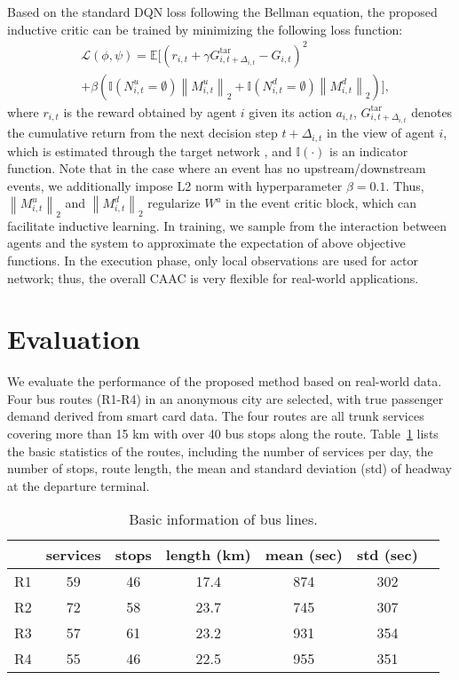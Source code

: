 \documentclass{article}
\begin{document}
Based on the standard DQN loss \cite{mnih2015human} following the  Bellman equation, the proposed inductive critic can be trained by minimizing the following loss function:
\begin{equation}
\begin{split}
&\mathcal{L}(\phi ,\psi ) = \mathbb{E}  \bigg[\left(r_{i,t} +\gamma G^{\text{tar}}_{i,t+\Delta_{i,t}}  - G_{i,t}  \right)^2  \\
&+\beta \left(
\mathbb{I}({{N}^u_{i,t}  =\emptyset })
\left\| M^u_{i,t} \right\|_2 + \mathbb{I}({{N}^d_{i,t}  =\emptyset })   \left\| M^d_{i,t} \right\|_2\right)\bigg],
\label{eq:critic}
\end{split}
\end{equation}
where $r_{i,t}$ is the reward obtained by agent $i$ given its action $a_{i,t}$, $G^{\text{tar}}_{i,t+\Delta_{i,t}}$ denotes the cumulative return from the next decision step $t+\Delta_{i,t}$ in the view of agent $i$, which is estimated through the target network \cite{mnih2015human}, and $\mathbb{I}(\cdot)$ is an indicator function.
Note that in the case where an event has no upstream/downstream events, we additionally impose L2 norm with hyperparameter $\beta=0.1$. Thus, $\left\| M^u_{i,t} \right\|_2$ and $\left\| M^d_{i,t} \right\|_2$ regularize $W^a$ in the event critic block, which can facilitate inductive learning. In training, we sample from the interaction between agents and the system to approximate the expectation of above objective functions. In the execution phase, only local observations are used for actor network; thus, the overall CAAC is very flexible for real-world applications.


\section{Evaluation}

We evaluate the performance of the proposed method based on real-world data. Four bus routes (R1-R4) in an anonymous city are selected, with true passenger demand derived from smart card data. The four routes are all trunk services covering more than 15 km with over 40 bus stops along the route. Table~\ref{lines} lists the basic statistics of the routes, including the number of services per day, the number of stops, route length, the mean and standard deviation (std) of headway at the departure terminal.

\begin{table}[!ht]
	\centering
    \footnotesize
\begin{tabular}{ccccccc}
\toprule
		 & services  & stops & length (km) & mean (sec) & std (sec)  \\
		\midrule
		R1 & 59  &46 & 17.4 &874 & 302  \\
		R2 & 72 &58 & 23.7 &745 & 307  \\
		R3 & 57  &61  & 23.2 &931 &354 \\
		R4   & 55  &46 & 22.5 &955 &351 \\
		\bottomrule
	\end{tabular}
    \caption{Basic information of bus lines.}
    	\label{lines}
\end{table}
\end{document}
